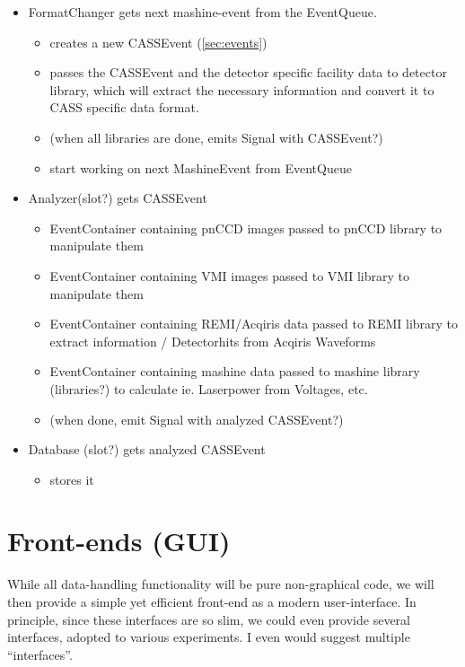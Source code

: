 \documentclass[11pt,a4paper,oneside]{article}
\begin{document}
\begin{itemize}
\item FormatChanger gets next mashine-event from the EventQueue.
	\begin{itemize}
	\item creates a new CASSEvent (\ref{sec:events})
	\item passes the CASSEvent and the detector specific facility data to detector library, which will extract the necessary information and convert it to CASS specific data format.
	\item (when all libraries are done, emits Signal with CASSEvent?)
	\item start working on next MashineEvent from EventQueue
	\end{itemize}
\item Analyzer(slot?) gets CASSEvent
   \begin{itemize}
   \item EventContainer containing pnCCD images passed to pnCCD library to manipulate them
   \item EventContainer containing VMI images passed to VMI library to manipulate them
   \item EventContainer containing REMI/Acqiris data passed to REMI library to extract information / Detectorhits from Acqiris Waveforms
   \item EventContainer containing mashine data passed to mashine library (libraries?) to calculate ie. Laserpower from Voltages, etc.
   \item (when done, emit Signal with analyzed CASSEvent?)
   \end{itemize}
\item Database (slot?) gets analyzed CASSEvent
   \begin{itemize}
   \item stores it
   \end{itemize}
\end{itemize}








\section{Front-ends (GUI)}
\label{sec:front-ends}

While all data-handling functionality will be pure non-graphical code, we will then provide a simple yet efficient front-end as a modern user-interface. In principle, since these interfaces are so slim, we could even provide several interfaces, adopted to various experiments. I even would suggest multiple ``interfaces''. 
\end{document}
